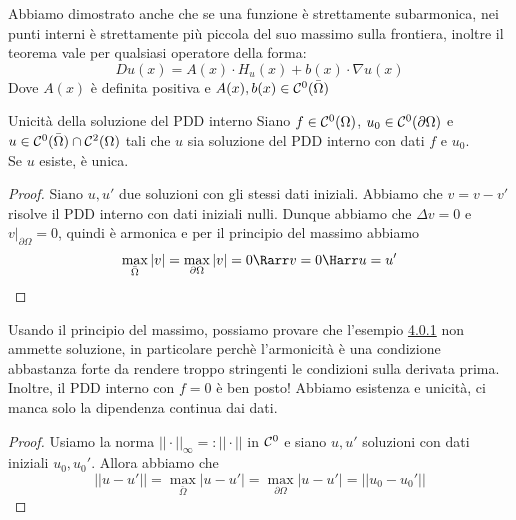 \documentclass{article}
\begin{document}
\begin{remark}{}{}
    Abbiamo dimostrato anche che se una funzione è strettamente subarmonica, nei punti interni è strettamente più piccola del suo massimo sulla frontiera, inoltre il teorema vale per qualsiasi operatore della forma:
    \[Du(x) = A(x)\cdot H_u(x) + b(x)\cdot \nabla u(x)\]
    Dove $A(x)$ è definita positiva e $A(x),b(x)\in\mathcal{C}^0(\bar{\Omega})$
\end{remark}

\begin{theorem}{Unicità della soluzione del PDD interno}{}
    Siano $f\in\mathcal{C}^0(\Omega)$, $u_0\in \mathcal{C}^0(\partial\Omega)$ e $u\in\mathcal{C}^0(\bar{\Omega})\cap\mathcal{C}^2(\Omega)$ tali che $u$ sia soluzione del PDD interno con dati $f$ e $u_0$.\\
    Se $u$ esiste, è unica.
\end{theorem}
\begin{proof}
    Siano $u,u'$ due soluzioni con gli stessi dati iniziali. Abbiamo che $v = v-v'$ risolve il PDD interno con dati iniziali nulli. Dunque abbiamo che $\Delta v = 0$ e $v|_{\partial\Omega} = 0$, quindi è armonica e per il principio del massimo abbiamo
    \[\max_{\bar{\Omega}}|v| = \max_{\partial\Omega} |v| = 0 \Rarr v=0\Harr u=u' \]
\end{proof}

\begin{remark}{}{}
    Usando il principio del massimo, possiamo provare che l'esempio \href{exmp:4.0.1}{4.0.1} non ammette soluzione, in particolare perchè l'armonicità è una condizione abbastanza forte da rendere troppo stringenti le condizioni sulla derivata prima.\\
    Inoltre, il PDD interno con $f=0$ è ben posto! Abbiamo esistenza e unicità, ci manca solo la dipendenza continua dai dati.
\end{remark}
\begin{proof}
    Usiamo la norma $||\cdot||_\infty =: ||\cdot ||$ in $\mathcal{C}^0$ e siano $u,u'$ soluzioni con dati iniziali $u_0,u_0'$. Allora abbiamo che 
    \[||u-u'|| = \max_{\bar{\Omega}} |u-u'| = \max_{\partial\Omega} |u-u'| = ||u_0-u_0'||\]
\end{proof}
\end{document}
